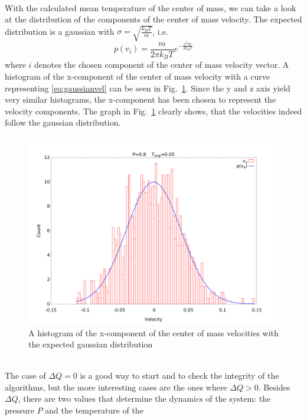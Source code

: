 \documentclass[12pt]{article}
\begin{document}
\\With the calculated mean temperature of the center of mass, we can take a look at the distribution of the components of the center of mass velocity.
The expected distribution is a gaussian with $\sigma=\sqrt{\frac{k_B T}{m}}$, i.e.
\begin{equation}
    \label{eq:gaussianvel}
    p(v_i) = \frac{m}{2\pi k_B T} e^{-\frac{x^2 m}{2 k_B T}}
\end{equation}
where $i$ denotes the chosen component of the center of mass velocity vector. A histogram of the x-component of the center of mass velocity  
with a curve representing \eqref{eq:gaussianvel} can be seen in Fig.~\ref{fig:comvel}. Since the y and z axis yield very similar histograms, the
x-component has been chosen to represent the velocity components. The graph in Fig.~\ref{fig:comvel} clearly shows, that the velocities indeed follow
the gaussian distribution.
\begin{figure}[h]
    \begin{center}
        \includegraphics[scale=0.4]{images/vcomtemp.pdf}
        \caption{A histogram of the x-component of the center of mass velocities with the expected gaussian distribution}
        \label{fig:comvel}
    \end{center}
\end{figure}
\\The case of $\Delta Q=0$ is a good way to start and to check the integrity of the algorithms, but the more interesting cases are the ones where
$\Delta Q > 0$. Besides $\Delta Q$, there are two values that determine the dynamics of the system: the pressure $P$ and the temperature of the
\end{document}
